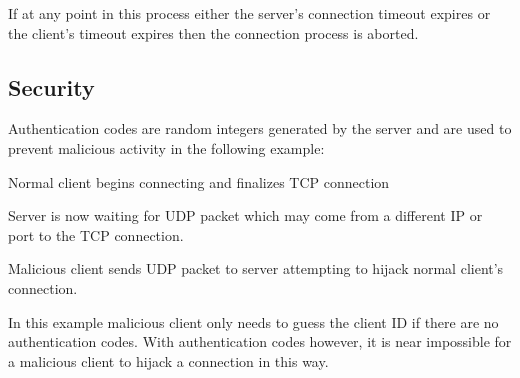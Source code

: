 \begin{DoxyItemize}
\item If at any point in this process either the server's connection timeout expires or the client's timeout expires then the connection process is aborted.\par
\par

\end{DoxyItemize}\hypertarget{handshakepage_handshakeProcessSecurity}{}\subsection{Security}\label{handshakepage_handshakeProcessSecurity}
Authentication codes are random integers generated by the server and are used to prevent malicious activity in the following example:
\begin{DoxyItemize}
\item Normal client begins connecting and finalizes TCP connection
\item Server is now waiting for UDP packet which may come from a different IP or port to the TCP connection.
\item Malicious client sends UDP packet to server attempting to hijack normal client's connection.\par

\end{DoxyItemize}

In this example malicious client only needs to guess the client ID if there are no authentication codes. With authentication codes however, it is near impossible for a malicious client to hijack a connection in this way.\par
\par
 